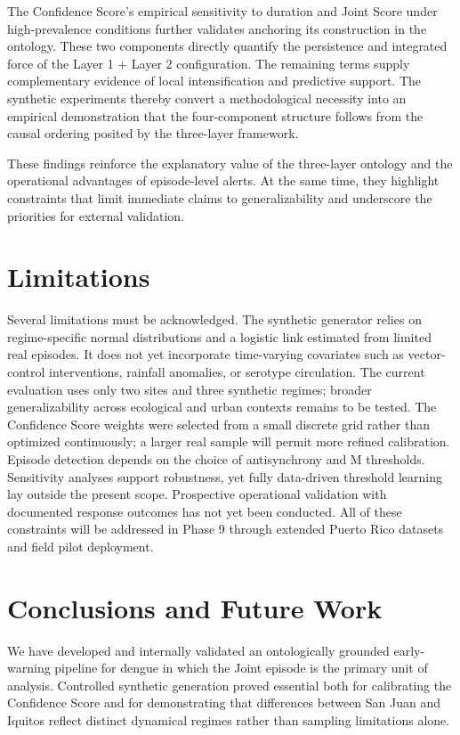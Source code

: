 \documentclass[11pt,a4paper]{article}
\begin{document}
The Confidence Score's empirical sensitivity to duration and Joint Score under high-prevalence conditions further validates anchoring its construction in the ontology. These two components directly quantify the persistence and integrated force of the Layer 1 + Layer 2 configuration. The remaining terms supply complementary evidence of local intensification and predictive support. The synthetic experiments thereby convert a methodological necessity into an empirical demonstration that the four-component structure follows from the causal ordering posited by the three-layer framework.

These findings reinforce the explanatory value of the three-layer ontology and the operational advantages of episode-level alerts. At the same time, they highlight constraints that limit immediate claims to generalizability and underscore the priorities for external validation.

\section{Limitations}

Several limitations must be acknowledged. The synthetic generator relies on regime-specific normal distributions and a logistic link estimated from limited real episodes. It does not yet incorporate time-varying covariates such as vector-control interventions, rainfall anomalies, or serotype circulation. The current evaluation uses only two sites and three synthetic regimes; broader generalizability across ecological and urban contexts remains to be tested. The Confidence Score weights were selected from a small discrete grid rather than optimized continuously; a larger real sample will permit more refined calibration. Episode detection depends on the choice of antisynchrony and M thresholds. Sensitivity analyses support robustness, yet fully data-driven threshold learning lay outside the present scope. Prospective operational validation with documented response outcomes has not yet been conducted. All of these constraints will be addressed in Phase 9 through extended Puerto Rico datasets and field pilot deployment.

\section{Conclusions and Future Work}

We have developed and internally validated an ontologically grounded early-warning pipeline for dengue in which the Joint episode is the primary unit of analysis. Controlled synthetic generation proved essential both for calibrating the Confidence Score and for demonstrating that differences between San Juan and Iquitos reflect distinct dynamical regimes rather than sampling limitations alone.
\end{document}
